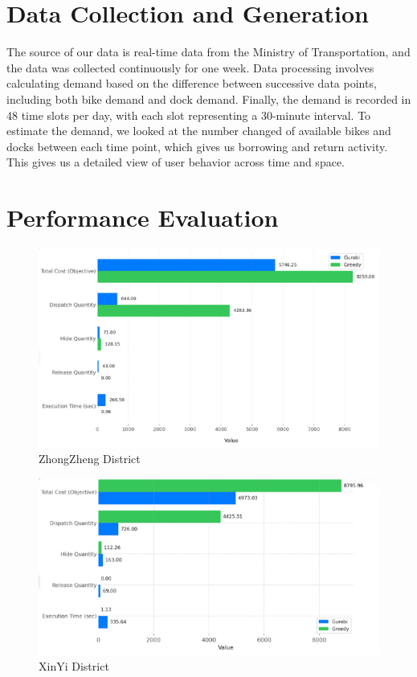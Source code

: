\documentclass[11pt,a4paper]{article}
\begin{document}
\section{Data Collection and Generation}

The source of our data is real-time data from the Ministry of Transportation, and the data was collected continuously for one week.
Data processing involves calculating demand based on the difference between successive data points, including both bike demand and dock demand.
Finally, the demand is recorded in 48 time slots per day, with each slot representing a 30-minute interval.
To estimate the demand, we looked at the number changed of available bikes and docks between each time point, which gives us borrowing and return activity. This gives us a detailed view of user behavior across time and space.

\section{Performance Evaluation}

\begin{figure}[H]
\centering
\includegraphics[width=textwidth]{Zhongzheng.png}
\caption{ZhongZheng District}
\label{Figure 1}
\end{figure}

\begin{figure}[H]
\centering
\includegraphics[width=textwidth]{Xinyi.png}
\caption{XinYi District}
\label{Figure 2}
\end{figure}
\end{document}
